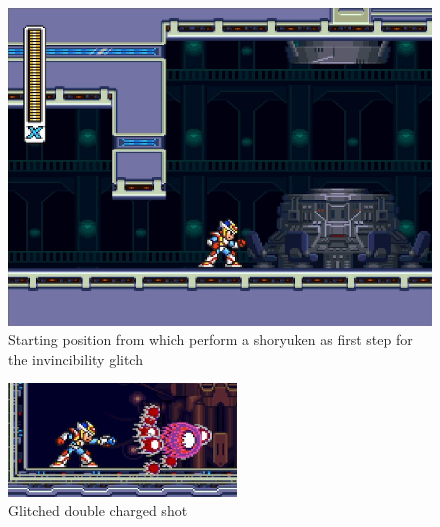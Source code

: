 \begin{figure}[htp]
	\centering
	\includegraphics[width=.7\linewidth]{figures/X2/Miscs/Sigma_glitch_start.png}
	\caption{Starting position from which perform a shoryuken as first step for the invincibility glitch}
	\label{X2_sigma_glitch_start}
\end{figure}
\begin{figure}[htp]
	\centering
	\includegraphics[height=3cm]{figures/X2/Miscs/glithced_double_shot.png}
	\caption{Glitched double charged shot}
	\label{X2_glitch_shot}
\end{figure}

